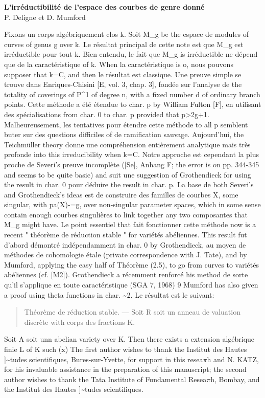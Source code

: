 \documentclass[11pt]{article}
\theoremstyle{plain}
\theoremstyle{definition}
\theoremstyle{remark}
\begin{document}
\begin{center}
{\Large\bfseries L'irr\'eductibilit\'e de l'espace des courbes de genre donn\'e}\\[0.7em]
{\large P. Deligne et D. Mumford}
\end{center}
Fixons un corps alg\'ebriquement clos k. Soit M\_g be the espace de modules of curves of genus g over k. Le r\'esultat principal de cette note est que M\_g est irr\'eductible pour tout k. Bien entendu, le fait que M\_g is irr\'eductible ne d\'epend que de la caract\'eristique of k. When la caract\'eristique is o, nous pouvons supposer that k=C, and then le r\'esultat est classique. Une preuve simple se trouve dans Enriques-Chisini [E, vol. 3, chap. 3], fond\'ee sur l'analyse de the totality of coverings of P\textasciicircum{}1 of degree n, with a fixed number d of ordinary branch points. Cette m\'ethode a \'et\'e \'etendue to char. p by William Fulton [F], en utilisant des sp\'ecialisations from char. 0 to char. p provided that p>2g+1. Malheureusement, les tentatives pour \'etendre cette m\'ethode to all p semblent buter sur des questions difficiles of de ramification sauvage. Aujourd'hui, the Teichm\"uller theory donne une compr\'ehension enti\`erement analytique mais tr\`es profonde into this irreducibility when k=C. Notre approche est cependant la plus proche de Severi's preuve incompl\`ete ([Se], Anhang F; the error is on pp. 344-345 and seems to be quite basic) and suit une suggestion of Grothendieck for using the result in char. 0 pour d\'eduire the result in char. p. La base de both Severi's and Grothendieck's ideas est de construire des familles de courbes X, some singular, with pa(X)-=g, over non-singular parameter spaces, which in some sense contain enough courbes singuli\`eres to link together any two composantes that M\_g might have. Le point essentiel that fait fonctionner cette m\'ethode now is a recent " th\'eor\`eme de r\'eduction stable " for vari\'et\'es ab\'eliennes. This result fut d'abord d\'emontr\'e ind\'ependamment in char. 0 by Grothendieck, au moyen de m\'ethodes de cohomologie \'etale (private correspondence with J. Tate), and by Mumford, applying the easy half of Th\'eor\`eme (2.5), to go from curves to vari\'et\'es ab\'eliennes (cf. [M2]). Grothendieck a r\'ecemment renforc\'e his method de sorte qu'il s'applique en toute caract\'eristique (SGA 7, 1968) 9 Mumford has also given a proof using theta functions in char. \textasciitilde{}2. Le r\'esultat est le suivant:

\begin{quote}Th\'eor\`eme de r\'eduction stable. --- Soit R soit un anneau de valuation discr\`ete with corps des fractions K.\end{quote}
Soit A soit unn abelian variety over K. Then there exists a extension alg\'ebrique finie L of K such (x) The first author wishes to thank the Institut des Hautes ]\textasciitilde{}tudes scientifiques, Bures-sur-Yvette, for support in this resea$\pi$h and N. KATZ, for his invaluable assistance in the preparation of this manuscript; the second author wishes to thank the Tata Institute of Fundamental Resea$\pi$h, Bombay, and the Institut des Hautes ]\textasciitilde{}tudes scientifiques.
\end{document}
